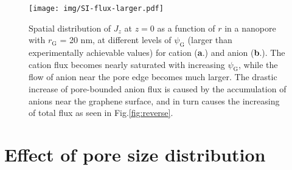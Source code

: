 \documentclass[manuscript=suppinfo,email=true, hyperref=true, keywords=false]{achemso}
\newcommand{\Fig}{Fig.}
\begin{document}
\begin{figure}[htbp]
  \centering
  \texttt{[image: img/SI-flux-larger.pdf]}
  \caption{Spatial distribution of $J_{z}$ at $z = 0$ as a function
    of $r$ in a nanopore with $r_{\mathrm{G}}$ = 20 nm, at different
    levels of $\psi_{\mathrm{G}}$ (larger than experimentally
    achievable values) for cation (\textbf{a}.) and anion
    (\textbf{b}.). The cation flux becomes nearly saturated with
    increasing $\psi_{\mathrm{G}}$, while the flow of anion near the
    pore edge becomes much larger. The drastic increase of
    pore-bounded anion flux is caused by the accumulation of anions
    near the graphene surface, and in turn causes the increasing of
    total flux as seen in \Fig \ref{fig:reverse}.}
  \label{fig:large-V}
\end{figure}
\clearpage{}

\section{Effect of pore size distribution}
\label{sec:pore-dist}
\end{document}
